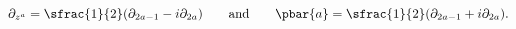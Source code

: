 \begin{equation}
 \partial_{z^a}=\sfrac{1}{2}(\partial_{2a-1}-i\partial_{2a})
 \qquad\text{and}\qquad
 \pbar{a}=\sfrac{1}{2}(\partial_{2a-1}+i\partial_{2a}).
\end{equation}

